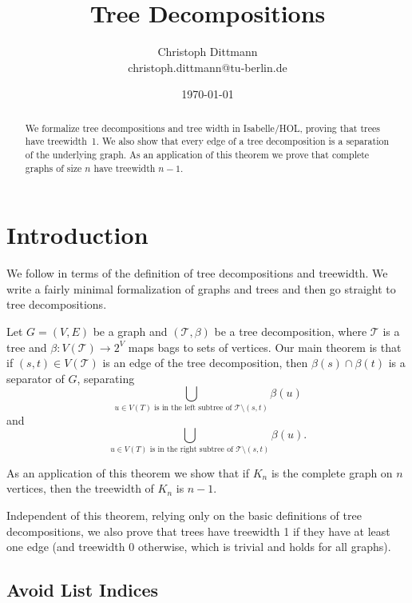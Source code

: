\documentclass[11pt,a4paper]{scrartcl}
\begin{document}
\title{Tree Decompositions}
\author{Christoph Dittmann\\christoph.dittmann@tu-berlin.de}
\date{\today}
\maketitle

\begin{abstract}
  We formalize tree decompositions and tree width in Isabelle/HOL,
  proving that trees have treewidth~1.  We also show that every edge
  of a tree decomposition is a separation of the underlying graph.  As
  an application of this theorem we prove that complete graphs of size
  $n$ have treewidth $n-1$.
\end{abstract}

\tableofcontents
\newpage

\section{Introduction}

We follow \cite{diestel2006} in terms of the definition of tree
decompositions and treewidth.  We write a fairly minimal formalization
of graphs and trees and then go straight to tree decompositions.

Let $G = (V,E)$ be a graph and $(\mathcal{T},\beta)$ be a tree
decomposition, where $\mathcal{T}$ is a tree and $\beta:
V(\mathcal{T}) \to 2^V$ maps bags to sets of vertices.  Our main
theorem is that if $(s,t) \in V(\mathcal{T})$ is an edge of the tree
decomposition, then $\beta(s) \cap \beta(t)$ is a separator of $G$,
separating
\[ \bigcup_{\text{$u \in V(T)$ is in the left subtree of $\mathcal{T}
      \setminus (s,t)$}} \beta(u) \] and
\[ \bigcup_{\text{$u \in V(T)$ is in the right subtree of $\mathcal{T}
      \setminus (s,t)$}} \beta(u). \]

As an application of this theorem we show that if $K_n$ is the
complete graph on $n$ vertices, then the treewidth of $K_n$ is $n-1$.

Independent of this theorem, relying only on the basic definitions of
tree decompositions, we also prove that trees have treewidth 1 if they
have at least one edge (and treewidth 0 otherwise, which is trivial
and holds for all graphs).

\subsection{Avoid List Indices}
\end{document}
